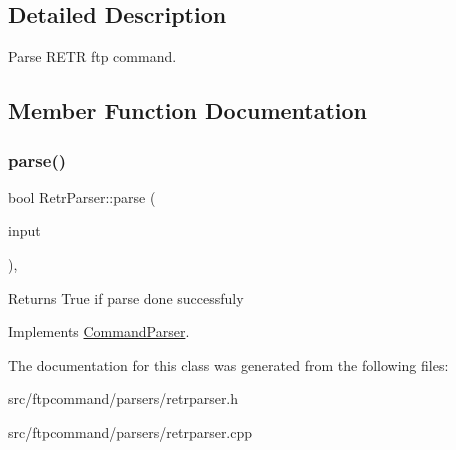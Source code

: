 \subsection{Detailed Description}
Parse R\+E\+TR ftp command. 

\subsection{Member Function Documentation}
\mbox{\label{classRetrParser_ace04fa9e7c638452de2d40dacc5a0471}} 
\subsubsection{\texorpdfstring{parse()}{parse()}}
{\footnotesize\ttfamily bool Retr\+Parser\+::parse (\begin{DoxyParamCaption}\item[{const Q\+String \&}]{input }\end{DoxyParamCaption})\hspace{0.3cm}{\ttfamily [override]}, {\ttfamily [virtual]}}

\begin{DoxyReturn}{Returns}
True if parse done successfuly 
\end{DoxyReturn}


Implements \hyperlink{classCommandParser_a5ed0855947a9b4500329f29b8123f2ea}{Command\+Parser}.



The documentation for this class was generated from the following files\+:\begin{DoxyCompactItemize}
\item 
src/ftpcommand/parsers/retrparser.\+h\item 
src/ftpcommand/parsers/retrparser.\+cpp\end{DoxyCompactItemize}
